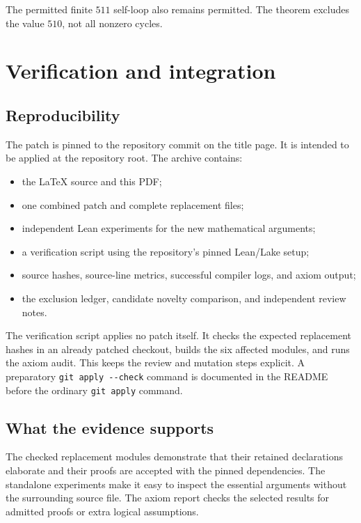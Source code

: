 \documentclass[11pt,letterpaper]{article}
\newcommand{\code}[1]{\nolinkurl{#1}}
\begin{document}
The permitted finite $511$ self-loop also remains permitted. The theorem
excludes the value $510$, not all nonzero cycles.

\section{Verification and integration}
\label{sec:verification}



\subsection{Reproducibility}

The patch is pinned to the repository commit on the title page. It is intended
to be applied at the repository root. The archive contains:

\begin{itemize}
\item the LaTeX source and this PDF;
\item one combined patch and complete replacement files;
\item independent Lean experiments for the new mathematical arguments;
\item a verification script using the repository's pinned Lean/Lake setup;
\item source hashes, source-line metrics, successful compiler logs, and axiom
  output;
\item the exclusion ledger, candidate novelty comparison, and independent
  review notes.
\end{itemize}

The verification script applies no patch itself. It checks the expected
replacement hashes in an already patched checkout, builds the six affected
modules, and runs the axiom audit. This keeps the review and mutation steps
explicit. A preparatory \code{git apply --check} command is documented in the
README before the ordinary \code{git apply} command.

\subsection{What the evidence supports}

The checked replacement modules demonstrate that their retained declarations
elaborate and their proofs are accepted with the pinned dependencies. The
standalone experiments make it easy to inspect the essential arguments without
the surrounding source file. The axiom report checks the selected results for
admitted proofs or extra logical assumptions.
\end{document}
